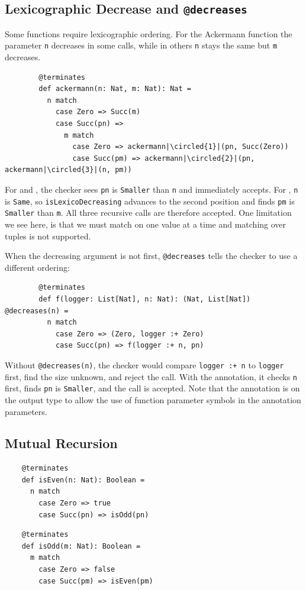 \subsection{Lexicographic Decrease and \texttt{@decreases}}
Some functions require lexicographic ordering. For the Ackermann function
the parameter \texttt{n} decreases in some calls, while in others \texttt{n}
stays the same but \texttt{m} decreases.
\begin{verbatim}
        @terminates
        def ackermann(n: Nat, m: Nat): Nat =
          n match
            case Zero => Succ(m)
            case Succ(pn) =>
              m match
                case Zero => ackermann|\circled{1}|(pn, Succ(Zero))
                case Succ(pm) => ackermann|\circled{2}|(pn, ackermann|\circled{3}|(n, pm))
\end{verbatim}
For  and , the checker sees \texttt{pn} is
\texttt{Smaller} than \texttt{n} and immediately accepts. For ,
\texttt{n} is \texttt{Same}, so \texttt{isLexicoDecreasing} advances to the
second position and finds \texttt{pm} is \texttt{Smaller} than \texttt{m}. All
three recursive calls are therefore accepted.
One limitation we see here, is that we must match on one value at a time and
matching over tuples is not supported.

When the decreasing argument is not first, \texttt{@decreases} tells the checker
to use a different ordering:
\begin{verbatim}
        @terminates
        def f(logger: List[Nat], n: Nat): (Nat, List[Nat]) @decreases(n) =
          n match
            case Zero => (Zero, logger :+ Zero)
            case Succ(pn) => f(logger :+ n, pn)
\end{verbatim}
Without \texttt{@decreases(n)}, the checker would compare \texttt{logger :+ n}
to \texttt{logger} first, find the size unknown, and reject the call. With the
annotation, it checks \texttt{n} first, finds \texttt{pn} is \texttt{Smaller},
and the call is accepted.
Note that the annotation is on the output type to allow the use of function
parameter symbols in the annotation parameters.

\subsection{Mutual Recursion} \label{sec:mutualRec}
\begin{minipage}[t]{0.45\textwidth}
    \begin{verbatim}
    @terminates
    def isEven(n: Nat): Boolean =
      n match
        case Zero => true
        case Succ(pn) => isOdd(pn)
    \end{verbatim}
\end{minipage}\hfill
\begin{minipage}[t]{0.45\textwidth}
    \begin{verbatim}
    @terminates
    def isOdd(m: Nat): Boolean =
      m match
        case Zero => false
        case Succ(pm) => isEven(pm)
    \end{verbatim}
\end{minipage}

